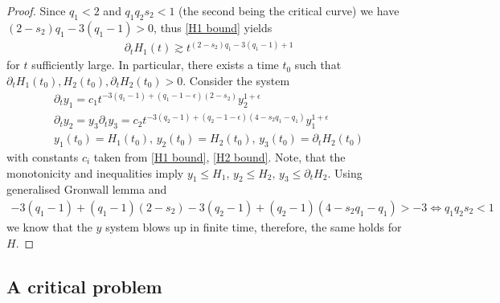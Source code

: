 \documentclass[11pt, oneside]{amsart}
\begin{document}
\begin{proof}
		Since $q_1<2$ and $q_1q_2s_2<1$ (the second being the critical curve) we have $(2-s_2)q_1-3(q_1-1)>0$, thus \eqref{H1 bound} yields
		\begin{equation*}
			\begin{gathered}
				\partial_t H_1(t)\gtrsim t^{(2-s_2)q_1-3(q_1-1)+1}
			\end{gathered}
		\end{equation*}
		for $t$ sufficiently large. In particular, there exists a time $t_0$ such that $\partial_tH_1(t_0),H_2(t_0),\partial_tH_2(t_0)>0$. Consider the system
		\begin{equation*}
			\begin{gathered}
				\partial_ty_1=c_1 t^{-3(q_1-1)+(q_1-1-\epsilon)(2-s_2)}y_2^{1+\epsilon}\\
				\partial_ty_2=y_3
				\partial_ty_3=c_2 t^{-3(q_2-1)+(q_2-1-\epsilon)(4-s_2q_1-q_1)}y_1^{1+\epsilon}\\
				y_1(t_0)=H_1(t_0),\,y_2(t_0)=H_2(t_0),\,y_3(t_0)=\partial_tH_2(t_0)
			\end{gathered}
		\end{equation*}
		with constants $c_i$ taken from \eqref{H1 bound}, \eqref{H2 bound}. Note, that the monotonicity and inequalities imply $y_1\leq H_1,\,y_2\leq H_2,\,y_3\leq \partial_tH_2$. Using generalised Gronwall lemma and 
		\begin{equation*}
			\begin{gathered}
				-3(q_1-1)+(q_1-1)(2-s_2)-3(q_2-1)+(q_2-1)(4-s_2q_1-q_1)>-3\iff q_1q_2s_2<1
			\end{gathered}
		\end{equation*}
		we know that the $y$ system blows up in finite time, therefore, the same holds for $H$.
		
	\end{proof}
	
	\subsection{A critical problem}\label{critical section}
	
\end{document}
